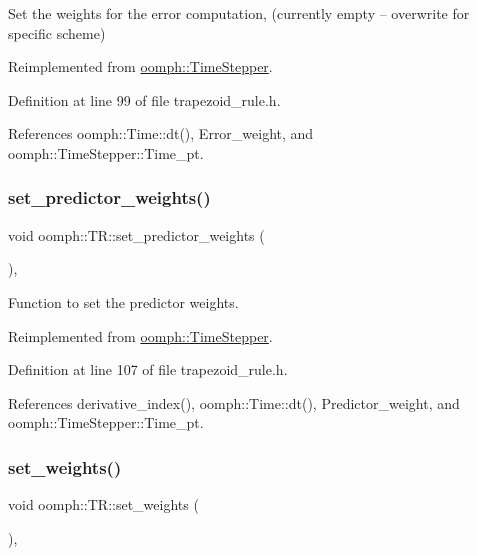 Set the weights for the error computation, (currently empty -- overwrite for specific scheme) 



Reimplemented from \hyperlink{classoomph_1_1TimeStepper_aee0c1da870a603e64efebb51dfc96a3d}{oomph\+::\+Time\+Stepper}.



Definition at line 99 of file trapezoid\+\_\+rule.\+h.



References oomph\+::\+Time\+::dt(), Error\+\_\+weight, and oomph\+::\+Time\+Stepper\+::\+Time\+\_\+pt.

\mbox{\label{classoomph_1_1TR_aef78c8db06cbf63829040190dfda04da}} 
\subsubsection{\texorpdfstring{set\+\_\+predictor\+\_\+weights()}{set\_predictor\_weights()}}
{\footnotesize\ttfamily void oomph\+::\+T\+R\+::set\+\_\+predictor\+\_\+weights (\begin{DoxyParamCaption}{ }\end{DoxyParamCaption})\hspace{0.3cm}{\ttfamily [inline]}, {\ttfamily [virtual]}}



Function to set the predictor weights. 



Reimplemented from \hyperlink{classoomph_1_1TimeStepper_a2dfb949155ba433066fd69dc427ba1ce}{oomph\+::\+Time\+Stepper}.



Definition at line 107 of file trapezoid\+\_\+rule.\+h.



References derivative\+\_\+index(), oomph\+::\+Time\+::dt(), Predictor\+\_\+weight, and oomph\+::\+Time\+Stepper\+::\+Time\+\_\+pt.

\mbox{\label{classoomph_1_1TR_afa7d2aa82b6a509ce9adc039ca46bacf}} 
\subsubsection{\texorpdfstring{set\+\_\+weights()}{set\_weights()}}
{\footnotesize\ttfamily void oomph\+::\+T\+R\+::set\+\_\+weights (\begin{DoxyParamCaption}{ }\end{DoxyParamCaption})\hspace{0.3cm}{\ttfamily [inline]}, {\ttfamily [virtual]}}



